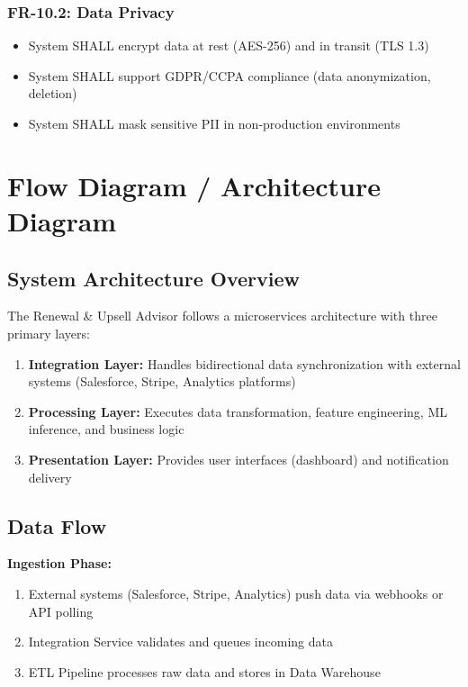 \documentclass[12pt,a4paper]{article}
\begin{document}
\subsubsection{FR-10.2: Data Privacy}
\begin{itemize}
    \item System SHALL encrypt data at rest (AES-256) and in transit (TLS 1.3)
    \item System SHALL support GDPR/CCPA compliance (data anonymization, deletion)
    \item System SHALL mask sensitive PII in non-production environments
\end{itemize}

\section{Flow Diagram / Architecture Diagram}

\subsection{System Architecture Overview}
The Renewal \& Upsell Advisor follows a microservices architecture with three primary layers:
\begin{enumerate}
    \item \textbf{Integration Layer:} Handles bidirectional data synchronization with external systems (Salesforce, Stripe, Analytics platforms)
    \item \textbf{Processing Layer:} Executes data transformation, feature engineering, ML inference, and business logic
    \item \textbf{Presentation Layer:} Provides user interfaces (dashboard) and notification delivery
\end{enumerate}

\subsection{Data Flow}
\textbf{Ingestion Phase:}
\begin{enumerate}
    \item External systems (Salesforce, Stripe, Analytics) push data via webhooks or API polling
    \item Integration Service validates and queues incoming data
    \item ETL Pipeline processes raw data and stores in Data Warehouse
\end{enumerate}
\end{document}
